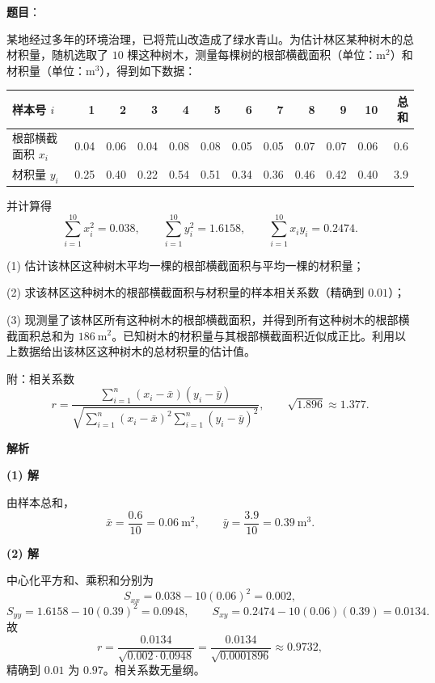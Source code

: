 \begin{answer}

\textbf{题目}：

某地经过多年的环境治理，已将荒山改造成了绿水青山。为估计林区某种树木的总材积量，随机选取了 $10$ 棵这种树木，测量每棵树的根部横截面积（单位：$\mathrm m^2$）和材积量（单位：$\mathrm m^3$），得到如下数据：

\begin{center}
\begingroup\setlength{\tabcolsep}{4pt}
\begin{tabular}{lrrrrrrrrrrr}
\toprule
样本号 $i$ & 1 & 2 & 3 & 4 & 5 & 6 & 7 & 8 & 9 & 10 & 总和 \\
\midrule
根部横截面积 $x_i$ & 0.04 & 0.06 & 0.04 & 0.08 & 0.08 & 0.05 & 0.05 & 0.07 & 0.07 & 0.06 & 0.6 \\
材积量 $y_i$ & 0.25 & 0.40 & 0.22 & 0.54 & 0.51 & 0.34 & 0.36 & 0.46 & 0.42 & 0.40 & 3.9 \\
\bottomrule
\end{tabular}
\endgroup
\end{center}

并计算得
\nopagebreak[4]
\[
\sum_{i=1}^{10}x_i^2=0.038,\qquad
\sum_{i=1}^{10}y_i^2=1.6158,\qquad
\sum_{i=1}^{10}x_iy_i=0.2474.
\]

(1) 估计该林区这种树木平均一棵的根部横截面积与平均一棵的材积量；

(2) 求该林区这种树木的根部横截面积与材积量的样本相关系数（精确到 $0.01$）；

(3) 现测量了该林区所有这种树木的根部横截面积，并得到所有这种树木的根部横截面积总和为 $186\ \mathrm m^2$。已知树木的材积量与其根部横截面积近似成正比。利用以上数据给出该林区这种树木的总材积量的估计值。

附：相关系数
\nopagebreak[4]
\[
r=\frac{\sum_{i=1}^{n}(x_i-\bar x)(y_i-\bar y)}
{\sqrt{\sum_{i=1}^{n}(x_i-\bar x)^2\sum_{i=1}^{n}(y_i-\bar y)^2}},
\qquad \sqrt{1.896}\approx1.377.
\]

\textbf{解析}

\textbf{(1) 解}

由样本总和，
\nopagebreak[4]
\[
\bar x=\frac{0.6}{10}=0.06\ \mathrm m^2,\qquad
\bar y=\frac{3.9}{10}=0.39\ \mathrm m^3.
\]

\textbf{(2) 解}

中心化平方和、乘积和分别为
\nopagebreak[4]
\[
S_{xx}=0.038-10(0.06)^2=0.002,
\]
\nopagebreak[4]
\[
S_{yy}=1.6158-10(0.39)^2=0.0948,
\qquad
S_{xy}=0.2474-10(0.06)(0.39)=0.0134.
\]
故
\nopagebreak[4]
\[
r=\frac{0.0134}{\sqrt{0.002\cdot0.0948}}
=\frac{0.0134}{\sqrt{0.0001896}}
\approx0.9732,
\]
精确到 $0.01$ 为 $0.97$。相关系数无量纲。


\end{answer}
